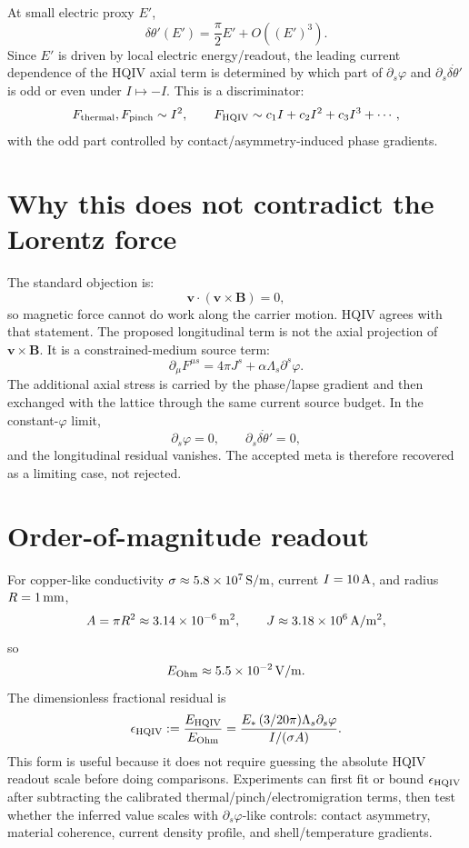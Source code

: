 \documentclass[11pt]{amsart}
\begin{document}
At small electric proxy $E'$,
\[
\delta\theta'(E')
  =
  \frac{\pi}{2}E' + O((E')^3).
\]
Since $E'$ is driven by local electric energy/readout, the leading current dependence of the HQIV axial term is determined by which part of $\partial_s\varphi$ and $\partial_s\dot{\delta\theta'}$ is odd or even under $I\mapsto -I$. This is a discriminator:
\[
F_{\rm thermal},F_{\rm pinch}\sim I^2,
\qquad
F_{\rm HQIV}\sim c_1 I+c_2 I^2+c_3 I^3+\cdots ,
\]
with the odd part controlled by contact/asymmetry-induced phase gradients.

\section{Why this does not contradict the Lorentz force}

The standard objection is:
\[
\mathbf v\cdot(\mathbf v\times\mathbf B)=0,
\]
so magnetic force cannot do work along the carrier motion. HQIV agrees with that statement. The proposed longitudinal term is not the axial projection of $\mathbf v\times\mathbf B$. It is a constrained-medium source term:
\[
\partial_\mu F^{\mu s}
  =
  4\pi J^s
  +\alpha\Lambda_s\partial^s\varphi .
\]
The additional axial stress is carried by the phase/lapse gradient and then exchanged with the lattice through the same current source budget. In the constant-$\varphi$ limit,
\[
\partial_s\varphi=0,
\qquad
\partial_s\dot{\delta\theta'}=0,
\]
and the longitudinal residual vanishes. The accepted meta is therefore recovered as a limiting case, not rejected.

\section{Order-of-magnitude readout}

For copper-like conductivity $\sigma\approx 5.8\times10^7\,{\rm S/m}$, current $I=10\,{\rm A}$, and radius $R=1\,{\rm mm}$,
\[
A=\pi R^2\approx 3.14\times10^{-6}\,{\rm m^2},
\qquad
J\approx 3.18\times10^6\,{\rm A/m^2},
\]
so
\[
E_{\rm Ohm}\approx 5.5\times10^{-2}\,{\rm V/m}.
\]
The dimensionless fractional residual is
\[
\epsilon_{\rm HQIV}
  :=
  \frac{E_{\rm HQIV}}{E_{\rm Ohm}}
  =
  \frac{
    E_\ast\,(3/20\pi)\Lambda_s\partial_s\varphi
  }{
    I/(\sigma A)
  }.
\]
This form is useful because it does not require guessing the absolute HQIV readout scale before doing comparisons. Experiments can first fit or bound $\epsilon_{\rm HQIV}$ after subtracting the calibrated thermal/pinch/electromigration terms, then test whether the inferred value scales with $\partial_s\varphi$-like controls: contact asymmetry, material coherence, current density profile, and shell/temperature gradients.
\end{document}
